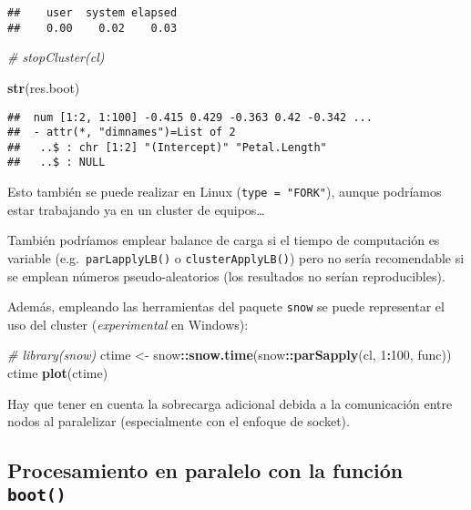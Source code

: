 \documentclass[
]{book}
\newenvironment{Shaded}{\begin{snugshade}}{\end{snugshade}}
\newcommand{\CommentTok}[1]{\textcolor[rgb]{0.56,0.35,0.01}{\textit{#1}}}
\newcommand{\DecValTok}[1]{\textcolor[rgb]{0.00,0.00,0.81}{#1}}
\newcommand{\KeywordTok}[1]{\textcolor[rgb]{0.13,0.29,0.53}{\textbf{#1}}}
\newcommand{\NormalTok}[1]{#1}
\newcommand{\OperatorTok}[1]{\textcolor[rgb]{0.81,0.36,0.00}{\textbf{#1}}}
\newcommand{\StringTok}[1]{\textcolor[rgb]{0.31,0.60,0.02}{#1}}
\theoremstyle{break}
\theoremstyle{definition}
\theoremstyle{definition}
\theoremstyle{definition}
\theoremstyle{remark}
\begin{document}
\begin{verbatim}
##    user  system elapsed 
##    0.00    0.02    0.03
\end{verbatim}

\begin{Shaded}
\begin{Highlighting}[]
\CommentTok{# stopCluster(cl)}

\KeywordTok{str}\NormalTok{(res.boot)}
\end{Highlighting}
\end{Shaded}

\begin{verbatim}
##  num [1:2, 1:100] -0.415 0.429 -0.363 0.42 -0.342 ...
##  - attr(*, "dimnames")=List of 2
##   ..$ : chr [1:2] "(Intercept)" "Petal.Length"
##   ..$ : NULL
\end{verbatim}

Esto también se puede realizar en Linux (\texttt{type\ =\ "FORK"}),
aunque podríamos estar trabajando ya en un cluster de equipos\ldots{}

También podríamos emplear balance de carga si el tiempo de computación es variable
(e.g.~\texttt{parLapplyLB()} o \texttt{clusterApplyLB()}) pero no sería recomendable si se emplean
números pseudo-aleatorios (los resultados no serían reproducibles).

Además, empleando las herramientas del paquete \texttt{snow} se puede representar el uso
del cluster (\emph{experimental} en Windows):

\begin{Shaded}
\begin{Highlighting}[]
\CommentTok{# library(snow)}
\NormalTok{ctime <-}\StringTok{ }\NormalTok{snow}\OperatorTok{::}\KeywordTok{snow.time}\NormalTok{(snow}\OperatorTok{::}\KeywordTok{parSapply}\NormalTok{(cl, }\DecValTok{1}\OperatorTok{:}\DecValTok{100}\NormalTok{, func))}
\NormalTok{ctime}
\KeywordTok{plot}\NormalTok{(ctime)}
\end{Highlighting}
\end{Shaded}

Hay que tener en cuenta la sobrecarga adicional debida a la comunicación entre nodos
al paralelizar (especialmente con el enfoque de socket).

\hypertarget{procesamiento-en-paralelo-con-la-funciuxf3n-boot}{%
\subsection{\texorpdfstring{Procesamiento en paralelo con la función \texttt{boot()}}{Procesamiento en paralelo con la función boot()}}\label{procesamiento-en-paralelo-con-la-funciuxf3n-boot}}
\end{document}
